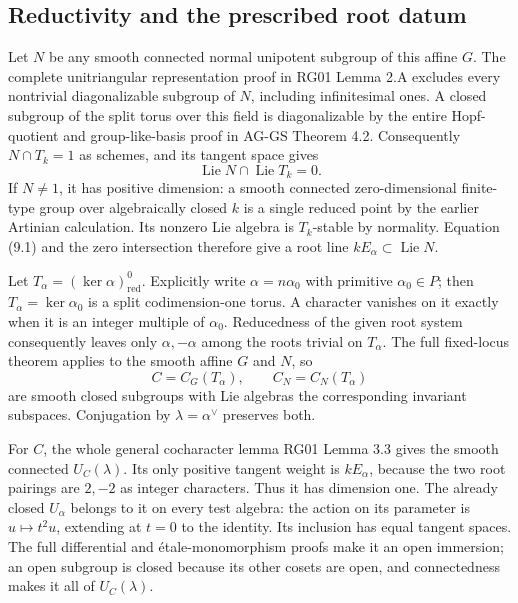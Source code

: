 \documentclass[11pt,a4paper,openany]{report}
\begin{document}
\subsection{Reductivity and the prescribed root datum}\label{AG-RG-05-reductivity-and-the-prescribed-root-datum}

Let \(N\) be any smooth connected normal unipotent subgroup of this affine \(G\). The complete unitriangular representation proof in RG01 Lemma 2.A excludes every nontrivial diagonalizable subgroup of \(N\), including infinitesimal ones. A closed subgroup of the split torus over this field is diagonalizable by the entire Hopf-quotient and group-like-basis proof in AG-GS Theorem 4.2. Consequently \(N\cap T_k=1\) as schemes, and its tangent space gives \[
\operatorname{Lie}N\cap\operatorname{Lie}T_k=0.
\] If \(N\ne1\), it has positive dimension: a smooth connected zero-dimensional finite-type group over algebraically closed \(k\) is a single reduced point by the earlier Artinian calculation. Its nonzero Lie algebra is \(T_k\)-stable by normality. Equation (9.1) and the zero intersection therefore give a root line \(kE_\alpha\subset\operatorname{Lie}N\).

Let \(T_\alpha=(\ker\alpha)^0_{\mathrm{red}}\). Explicitly write \(\alpha=n\alpha_0\) with primitive \(\alpha_0\in P\); then \(T_\alpha=\ker\alpha_0\) is a split codimension-one torus. A character vanishes on it exactly when it is an integer multiple of \(\alpha_0\). Reducedness of the given root system consequently leaves only \(\alpha,-\alpha\) among the roots trivial on \(T_\alpha\). The full fixed-locus theorem applies to the smooth affine \(G\) and \(N\), so \[
C=C_G(T_\alpha),\qquad C_N=C_N(T_\alpha)
\] are smooth closed subgroups with Lie algebras the corresponding invariant subspaces. Conjugation by \(\lambda=\alpha^\vee\) preserves both.

For \(C\), the whole general cocharacter lemma RG01 Lemma 3.3 gives the smooth connected \(U_C(\lambda)\). Its only positive tangent weight is \(kE_\alpha\), because the two root pairings are \(2,-2\) as integer characters. Thus it has dimension one. The already closed \(U_\alpha\) belongs to it on every test algebra: the action on its parameter is \(u\mapsto t^2u\), extending at \(t=0\) to the identity. Its inclusion has equal tangent spaces. The full differential and étale-monomorphism proofs make it an open immersion; an open subgroup is closed because its other cosets are open, and connectedness makes it all of \(U_C(\lambda)\).
\end{document}
